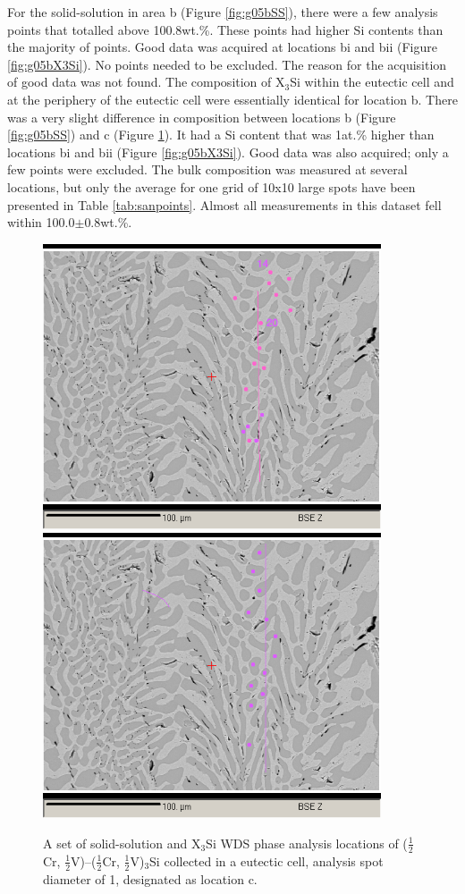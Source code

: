 For the solid-solution in area b (Figure \ref{fig:g05bSS}), there were a few analysis points that totalled above 100.8wt.\%.
These points had higher Si contents than the majority of points.  Good data was acquired at locations bi and bii (Figure \ref{fig:g05bX3Si}).  No points needed to be excluded.  The reason for the acquisition of good data was not found.  The composition of X$_3$Si within the eutectic cell and at the periphery of the eutectic cell were essentially identical for location b.  There was a very slight difference in composition between locations b (Figure \ref{fig:g05bSS}) and c (Figure \ref{fig:g05c}).   It had a Si content that was 1at.\% higher than locations bi and bii (Figure \ref{fig:g05bX3Si}).  Good data was also acquired; only a few points were excluded.  The bulk composition was measured at several locations, but only the average for one grid of 10x10 large spots have been presented in Table \ref{tab:sanpoints}.  Almost all measurements in this dataset fell within 100.0$\pm$0.8wt.\%.

%
\begin{figure}[H]
\begin{center}
\includegraphics[width=10cm]{g05cSS}
\includegraphics[width=10cm]{g05cpointsx3si}
\caption{A set of solid-solution and X$_3$Si WDS phase analysis locations of ($\frac{1}{2}$Cr, $\frac{1}{2}$V)--($\frac{1}{2}$Cr, $\frac{1}{2}$V)$_3$Si collected in a eutectic cell, analysis spot diameter of 1\micro\metre, designated as location c.}
\label{fig:g05c}
\end{center}
\end{figure}
%
